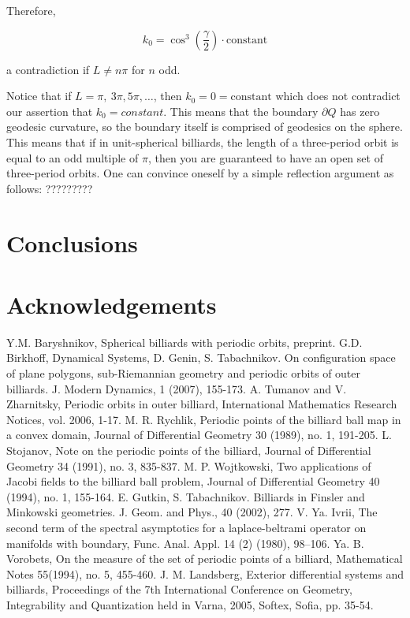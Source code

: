 \documentclass[11pt]{article}
\theoremstyle{plain}
\theoremstyle{definition}
\begin{document}
Therefore,

\begin{equation*}
k_0=\cos^3(\frac{\gamma}{2})\cdot \mbox{constant}
\end{equation*}

a contradiction if $L\neq n \pi$ for $n$ odd.
\newline

Notice that if $L=\pi,\ 3\pi, 5\pi,\ldots$, then $k_0=0=\mbox{constant}$ which does not contradict our assertion that $k_0=constant$. This means that the boundary $\partial Q$ has zero geodesic curvature, so the boundary itself is comprised of geodesics on the sphere. This means that if in unit-spherical billiards, the length of a three-period orbit is equal to an odd multiple of $\pi$, then you are guaranteed to have an open set of three-period orbits. One can convince oneself by a simple reflection argument as follows: ?????????


\section{Conclusions}
\section{Acknowledgements}

\begin{thebibliography}{100}
 Y.M. Baryshnikov, Spherical billiards with periodic orbits, preprint.
 G.D. Birkhoff, Dynamical Systems,
 D. Genin, S. Tabachnikov. On configuration space of plane polygons, sub-Riemannian geometry
and periodic orbits of outer billiards. J. Modern Dynamics, 1 (2007), 155-173.
 A. Tumanov and V. Zharnitsky, Periodic orbits in outer billiard, International Mathematics Research Notices, vol. 2006, 1-17.
 M. R. Rychlik, Periodic points of the billiard ball map in a convex domain, Journal of Differential Geometry 30 (1989), no. 1, 191-205.
 L. Stojanov, Note on the periodic points of the billiard, Journal of Differential Geometry 34 (1991), no. 3, 835-837.
 M. P. Wojtkowski, Two applications of Jacobi fields to the billiard ball problem, Journal of Differential Geometry 40 (1994), no. 1, 155-164.
 E. Gutkin, S. Tabachnikov. Billiards in Finsler and Minkowski geometries. J. Geom. and Phys., 40 (2002), 277.
 V. Ya. Ivrii, The second term of the spectral asymptotics for a laplace-beltrami operator on manifolds with boundary, Func. Anal. Appl. 14 (2) (1980), 98–106.
 Ya. B. Vorobets, On the measure of the set of periodic points of a billiard, Mathematical Notes 55(1994), no. 5, 455-460.
 J. M. Landsberg, Exterior differential systems and billiards, Proceedings of the 7th International Conference on Geometry, Integrability and Quantization held in Varna, 2005, Softex, Sofia, pp. 35-54.

\end{thebibliography}
\end{document}
